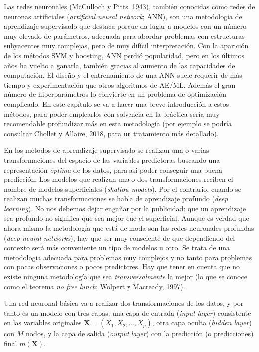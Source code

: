 \documentclass[
  spanish,
]{book}
\theoremstyle{break}
\theoremstyle{definition}
\theoremstyle{definition}
\theoremstyle{definition}
\theoremstyle{remark}
\begin{document}
Las redes neuronales (McCulloch y Pitts, \protect\hyperlink{ref-mcculloch1943logical}{1943}), también conocidas como redes de neuronas artificiales (\emph{artificial neural network}; ANN), son una metodología de aprendizaje supervisado que destaca porque da lugar a modelos con un número muy elevado de parámetros, adecuada para abordar problemas con estructuras subyacentes muy complejas, pero de muy difícil interpretación.
Con la aparición de los métodos SVM y boosting, ANN perdió popularidad, pero en los últimos años ha vuelto a ganarla, también gracias al aumento de las capacidades de computación.
El diseño y el entrenamiento de una ANN suele requerir de más tiempo y experimentación que otros algoritmos de AE/ML. Además el gran número de hiperparámetros lo convierte en un problema de optimización complicado.
En este capítulo se va a hacer una breve introducción a estos métodos, para poder emplearlos con solvencia en la práctica sería muy recomendable profundizar más en esta metodología (por ejemplo se podría consultar Chollet y Allaire, \protect\hyperlink{ref-chollet2018deep}{2018}, para un tratamiento más detallado).

En los métodos de aprendizaje supervisado se realizan una o varias transformaciones del espacio de las variables predictoras buscando una representación \emph{óptima} de los datos, para así poder conseguir una buena predicción. Los modelos que realizan una o dos transformaciones reciben el nombre de modelos superficiales (\emph{shallow models}). Por el contrario, cuando se realizan muchas transformaciones se habla de aprendizaje profundo (\emph{deep learning}). No nos debemos dejar engañar por la publicidad: que un aprendizaje sea profundo no significa que sea mejor que el superficial. Aunque es verdad que ahora mismo la metodología que está de moda son las redes neuronales profundas (\emph{deep neural networks}), hay que ser muy consciente de que dependiendo del contexto será más conveniente un tipo de modelos u otro. Se trata de una metodología adecuada para problemas muy complejos y no tanto para problemas con pocas observaciones o pocos predictores. Hay que tener en cuenta que no existe ninguna metodología que sea \emph{transversalmente} la mejor (lo que se conoce como el teorema \emph{no free lunch}; Wolpert y Macready, \protect\hyperlink{ref-wolpert1997no}{1997}).

Una red neuronal básica va a realizar dos transformaciones de los datos, y por tanto es un modelo con tres capas: una capa de entrada (\emph{input layer}) consistente en las variables originales \(\mathbf{X} = (X_1,X_2,\ldots, X_p)\), otra capa oculta (\emph{hidden layer}) con \(M\) nodos, y la capa de salida (\emph{output layer}) con la predicción (o predicciones) final \(m(\mathbf{X})\).
\end{document}
